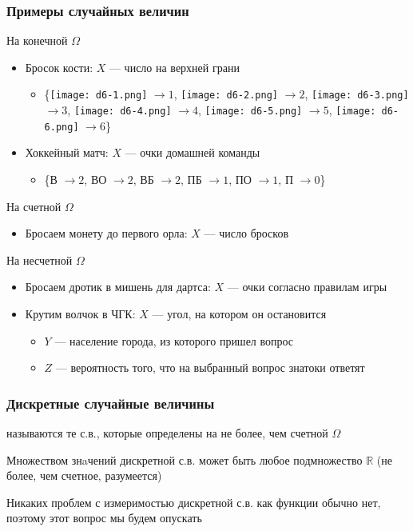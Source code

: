\documentclass[hyperref=unicode,graphics=pdflatex,13pt,xcolor={usenames,dvipsnames}]{beamer}
\renewcommand\emph[1]{{\color{blue}{#1}}}
\newcommand\R{\mathbb{R}}
\begin{document}
\begin{frame}
  \frametitle{Примеры случайных величин}
  На конечной $\Omega$

  \begin{itemize}
    \item Бросок кости: $X$ --- число на верхней грани
    \begin{itemize}
      \item \{\texttt{[image: d6-1.png]} $\to 1$, \texttt{[image: d6-2.png]} $\to 2$, \texttt{[image: d6-3.png]} $\to 3$, \texttt{[image: d6-4.png]} $\to 4$, \texttt{[image: d6-5.png]} $\to 5$, \texttt{[image: d6-6.png]} $\to 6$\}
    \end{itemize}
    \item Хоккейный матч: $X$ --- очки домашней команды
    \begin{itemize}
      \item \{В $\to 2$, ВО $\to 2$, ВБ $\to 2$, ПБ $\to 1$, ПО $\to 1$, П $\to 0$\}
    \end{itemize} 
  \end{itemize}

  \pause
  На счетной $\Omega$
  \begin{itemize}
    \item Бросаем монету до первого орла: $X$ --- число бросков
  \end{itemize}

  \pause
  На несчетной $\Omega$
  \begin{itemize}
    \item Бросаем дротик в мишень для дартса: $X$ --- очки согласно правилам игры
    \item Крутим волчок в ЧГК: $X$ --- угол, на котором он остановится
    \begin{itemize}
      \item $Y$ --- население города, из которого пришел вопрос
      \item $Z$ --- вероятность того, что на выбранный вопрос знатоки ответят
    \end{itemize}
  \end{itemize}
\end{frame}

\begin{frame}
  \frametitle{Дискретные случайные величины}

  \emph{Дискретными} называются те с.в., которые определены на не более, чем счетной $\Omega$

  \vspace{1cm}\pause 
  \emph{NB:} Множеством знaчений дискретной с.в. может быть любое подмножество $\R$ (не более, чем счетное, разумеется)

  \vspace{1cm}\pause
  \emph{NB-2:} Никаких проблем с измеримостью дискретной с.в. как функции обычно нет, поэтому этот вопрос мы будем опускать
\end{frame}
\end{document}
